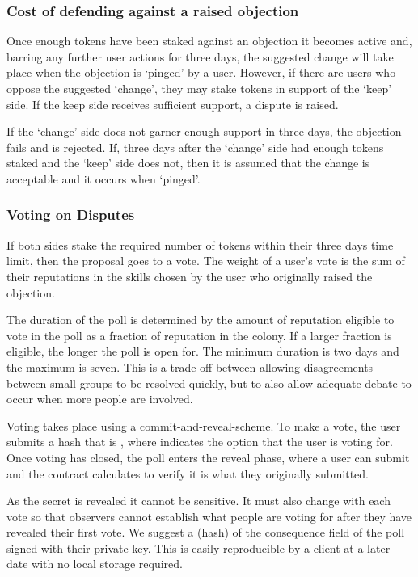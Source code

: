 \subsubsection{Cost of defending against a raised objection}
Once enough tokens have been staked against an objection it becomes active and, barring any further user actions for three days, the suggested change will take place when the objection is `pinged' by a user. However, if there are users who oppose the suggested `change', they may stake tokens in support of the `keep' side. If the keep side receives sufficient support, a dispute is raised. 

If the `change' side does not garner enough support in three days, the objection fails and is rejected. If, three days after the `change' side had enough tokens staked and the `keep' side does not, then it is assumed that the change is acceptable and it occurs when `pinged'. 

\subsubsection{Voting on Disputes}
If both sides stake the required number of tokens within their three days time limit, then the proposal goes to a vote. The weight of a user's vote is the sum of their reputations in the skills chosen by the user who originally raised the objection.

The duration of the poll is determined by the amount of reputation eligible to vote in the poll as a fraction of reputation in the colony. If a larger fraction is eligible, the longer the poll is open for. The minimum duration is two days and the maximum is seven. This is a trade-off between allowing disagreements between small groups to be resolved quickly, but to also allow adequate debate to occur when more people are involved. 

Voting takes place using a commit-and-reveal-scheme. To make a vote, the user submits a hash that is , where  indicates the option that the user is voting for. Once voting has closed, the poll enters the reveal phase, where a user can submit  and the contract calculates  to verify it is what they originally submitted.

As the secret is revealed it cannot be sensitive. It must also change with each vote so that observers cannot establish what people are voting for after they have revealed their first vote. We suggest a (hash) of the consequence field of the poll signed with their private key. This is easily reproducible by a client at a later date with no local storage required.

